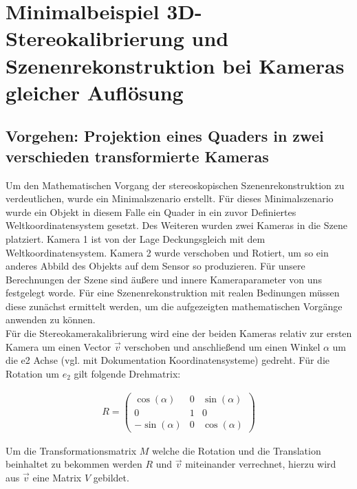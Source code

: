 \chapter{Minimalbeispiel 3D-Stereokalibrierung und Szenenrekonstruktion bei Kameras gleicher Auflösung}



\section{Vorgehen: Projektion eines Quaders in zwei verschieden transformierte Kameras}

Um den Mathematischen Vorgang der stereoskopischen Szenenrekonstruktion zu verdeutlichen, wurde ein Minimalszenario erstellt. Für dieses Minimalszenario wurde ein Objekt in diesem Falle ein Quader in ein zuvor Definiertes Weltkoordinatensystem gesetzt. Des Weiteren wurden zwei Kameras in die Szene platziert. Kamera 1 ist von der Lage Deckungsgleich mit dem Weltkoordinatensystem. Kamera 2 wurde verschoben und Rotiert, um so ein anderes Abbild des Objekts auf dem Sensor so produzieren. Für unsere Berechnungen der Szene sind äußere und innere Kameraparameter von uns festgelegt worde. Für eine Szenenrekonstruktion mit realen Bedinungen müssen diese zunächst ermittelt werden, um die aufgezeigten mathematischen Vorgänge anwenden zu können.\\

	Für die Stereokamerakalibrierung wird eine der beiden Kameras relativ zur ersten Kamera um einen Vector \ensuremath{\vec{v}} verschoben und anschließend um einen Winkel \ensuremath{\alpha} um die e2 Achse (vgl. mit Dokumentation Koordinatensysteme) gedreht. 
Für die Rotation um \ensuremath{e_2} gilt folgende Drehmatrix:

\begin{gather}		
R= 
\begin{pmatrix}
\cos(\alpha)&0&\sin(\alpha)\\
0&1&0\\
-\sin(\alpha)&0&\cos(\alpha)
\end{pmatrix}
\end{gather}

Um die Transformationsmatrix \ensuremath{M} welche die Rotation und die Translation beinhaltet zu bekommen werden \ensuremath{R} und \ensuremath{\vec{v}} miteinander verrechnet, hierzu wird aus \ensuremath{\vec{v}} eine Matrix \ensuremath{V} gebildet. 

